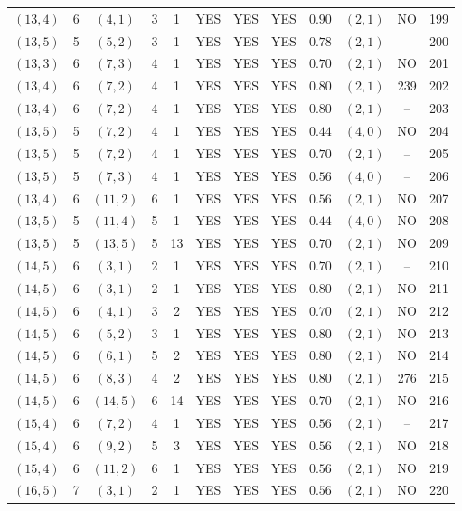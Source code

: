 \begin{longtable}{|c|c|c|c|c|c|c|c|c|c|c|c|}
$(13,4)$ & 6 & $(4,1)$ & 3 & 1 & YES & YES & YES & $0.90$ & $(2,1)$ & NO & 199\\
$(13,5)$ & 5 & $(5,2)$ & 3 & 1 & YES & YES & YES & $0.78$ & $(2,1)$ & -- & 200\\
$(13,3)$ & 6 & $(7,3)$ & 4 & 1 & YES & YES & YES & $0.70$ & $(2,1)$ & NO & 201\\
$(13,4)$ & 6 & $(7,2)$ & 4 & 1 & YES & YES & YES & $0.80$ & $(2,1)$ & 239 & 202\\
$(13,4)$ & 6 & $(7,2)$ & 4 & 1 & YES & YES & YES & $0.80$ & $(2,1)$ & -- & 203\\
$(13,5)$ & 5 & $(7,2)$ & 4 & 1 & YES & YES & YES & $0.44$ & $(4,0)$ & NO & 204\\
$(13,5)$ & 5 & $(7,2)$ & 4 & 1 & YES & YES & YES & $0.70$ & $(2,1)$ & -- & 205\\
$(13,5)$ & 5 & $(7,3)$ & 4 & 1 & YES & YES & YES & $0.56$ & $(4,0)$ & -- & 206\\
$(13,4)$ & 6 & $(11,2)$ & 6 & 1 & YES & YES & YES & $0.56$ & $(2,1)$ & NO & 207\\
$(13,5)$ & 5 & $(11,4)$ & 5 & 1 & YES & YES & YES & $0.44$ & $(4,0)$ & NO & 208\\
$(13,5)$ & 5 & $(13,5)$ & 5 & 13 & YES & YES & YES & $0.70$ & $(2,1)$ & NO & 209\\
$(14,5)$ & 6 & $(3,1)$ & 2 & 1 & YES & YES & YES & $0.70$ & $(2,1)$ & -- & 210\\
$(14,5)$ & 6 & $(3,1)$ & 2 & 1 & YES & YES & YES & $0.80$ & $(2,1)$ & NO & 211\\
$(14,5)$ & 6 & $(4,1)$ & 3 & 2 & YES & YES & YES & $0.70$ & $(2,1)$ & NO & 212\\
$(14,5)$ & 6 & $(5,2)$ & 3 & 1 & YES & YES & YES & $0.80$ & $(2,1)$ & NO & 213\\
$(14,5)$ & 6 & $(6,1)$ & 5 & 2 & YES & YES & YES & $0.80$ & $(2,1)$ & NO & 214\\
$(14,5)$ & 6 & $(8,3)$ & 4 & 2 & YES & YES & YES & $0.80$ & $(2,1)$ & 276 & 215\\
$(14,5)$ & 6 & $(14,5)$ & 6 & 14 & YES & YES & YES & $0.70$ & $(2,1)$ & NO & 216\\
$(15,4)$ & 6 & $(7,2)$ & 4 & 1 & YES & YES & YES & $0.56$ & $(2,1)$ & -- & 217\\
$(15,4)$ & 6 & $(9,2)$ & 5 & 3 & YES & YES & YES & $0.56$ & $(2,1)$ & NO & 218\\
$(15,4)$ & 6 & $(11,2)$ & 6 & 1 & YES & YES & YES & $0.56$ & $(2,1)$ & NO & 219\\
$(16,5)$ & 7 & $(3,1)$ & 2 & 1 & YES & YES & YES & $0.56$ & $(2,1)$ & NO & 220\\

\end{longtable}
